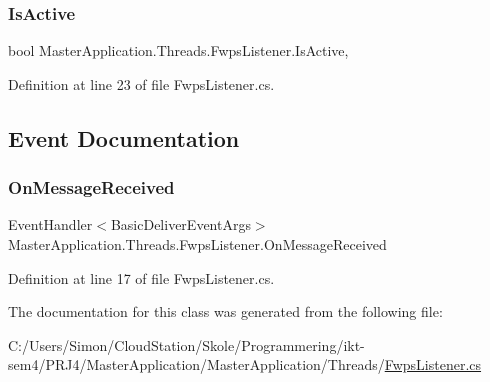 \subsubsection{\texorpdfstring{Is\+Active}{IsActive}}
{\footnotesize\ttfamily bool Master\+Application.\+Threads.\+Fwps\+Listener.\+Is\+Active\hspace{0.3cm}{\ttfamily [get]}, {}}



Definition at line 23 of file Fwps\+Listener.\+cs.



\subsection{Event Documentation}
\mbox{\label{class_master_application_1_1_threads_1_1_fwps_listener_a800200e774b70976a987207845b6f953}} 
\subsubsection{\texorpdfstring{On\+Message\+Received}{OnMessageReceived}}
{\footnotesize\ttfamily Event\+Handler$<$Basic\+Deliver\+Event\+Args$>$ Master\+Application.\+Threads.\+Fwps\+Listener.\+On\+Message\+Received}



Definition at line 17 of file Fwps\+Listener.\+cs.



The documentation for this class was generated from the following file\+:\begin{DoxyCompactItemize}
\item 
C\+:/\+Users/\+Simon/\+Cloud\+Station/\+Skole/\+Programmering/ikt-\/sem4/\+P\+R\+J4/\+Master\+Application/\+Master\+Application/\+Threads/\mbox{\hyperlink{_fwps_listener_8cs}{Fwps\+Listener.\+cs}}\end{DoxyCompactItemize}
